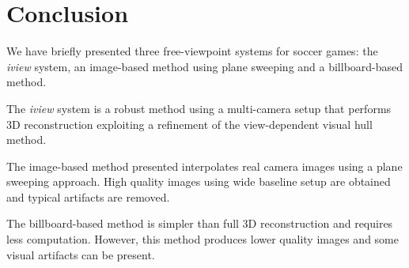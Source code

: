 \section{Conclusion}
We have briefly presented three free-viewpoint systems for soccer games: the \textit{iview} system, an image-based method using 
plane sweeping and a billboard-based method.

The \textit{iview} system is a robust method using a multi-camera setup that performs 3D reconstruction exploiting a refinement 
of the view-dependent visual hull method.

The image-based method presented interpolates real camera images using a plane sweeping approach.
High quality images using wide baseline setup are obtained and typical artifacts are removed.

The billboard-based method is simpler than full 3D reconstruction and requires less computation.
However, this method produces lower quality images and some visual artifacts can be present.

